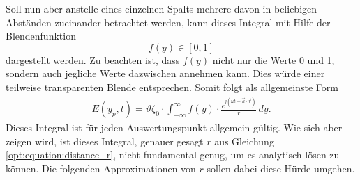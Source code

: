 Soll nun aber anstelle eines einzelnen Spalts mehrere davon in beliebigen Abständen zueinander betrachtet werden, kann dieses Integral mit Hilfe der Blendenfunktion
\begin{equation*}
f(y)
\in
[0, 1]
\end{equation*}
dargestellt werden.
Zu beachten ist, dass $f(y)$ nicht nur die Werte 0 und 1, sondern auch jegliche Werte dazwischen annehmen kann.
Dies würde einer teilweise transparenten Blende entsprechen.
Somit folgt als allgemeinste Form
\begin{align}
E(y_p, t)
=
\vartheta\zeta_0 \cdot \int_{-\infty}^{\infty}f(y)\cdot\frac{e^{j(\omega t - \vec{k}\cdot\vec{r})}}{r} \,dy
.
\label{opt:equation:integral_general}
\end{align}
Dieses Integral ist für jeden Auswertungspunkt allgemein gültig.
Wie sich aber zeigen wird, ist dieses Integral, genauer gesagt $r$ aus Gleichung \eqref{opt:equation:distance_r}, nicht fundamental genug, um es analytisch lösen zu können.
Die folgenden Approximationen von $r$ sollen dabei diese Hürde umgehen.

